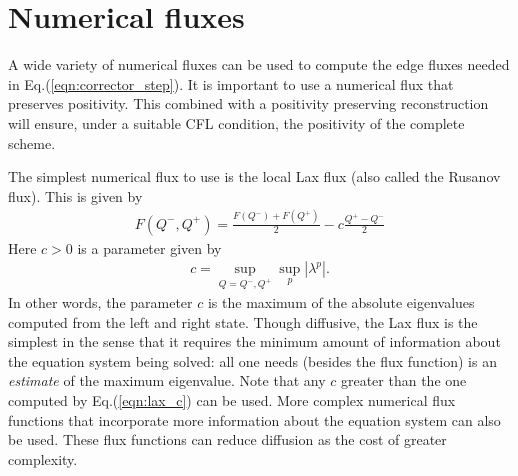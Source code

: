 \documentclass[11pt, reqno]{amsart}
\newcommand{\eqr}[1]{Eq.\thinspace(#1)}
\theoremstyle{definition}
\begin{document}
\section{Numerical fluxes}

A wide variety of numerical fluxes can be used to compute the edge
fluxes needed in \eqr{\ref{eqn:corrector_step}}. It is important to
use a numerical flux that preserves positivity. This combined with a
positivity preserving reconstruction will ensure, under a suitable CFL
condition, the positivity of the complete scheme.

The simplest numerical flux to use is the local Lax flux (also called
the Rusanov flux). This is given by
\begin{align}
  F(Q^-,Q^+) = \frac{F(Q^-) + F(Q^+)}{2} - c\frac{Q^+- Q^-}{2}
\end{align}
Here $c>0$ is a parameter given by
\begin{align}
  c = \sup_{Q=Q^-,Q^+} \sup_p | \lambda^p |. \label{eqn:lax_c}
\end{align}
In other words, the parameter $c$ is the maximum of the absolute
eigenvalues computed from the left and right state. Though diffusive,
the Lax flux is the simplest in the sense that it requires the minimum
amount of information about the equation system being solved: all one
needs (besides the flux function) is an \emph{estimate} of the maximum
eigenvalue. Note that any $c$ greater than the one computed by
\eqr{\ref{eqn:lax_c}} can be used. More complex numerical flux
functions that incorporate more information about the equation system
can also be used. These flux functions can reduce diffusion as the
cost of greater complexity.
\end{document}
